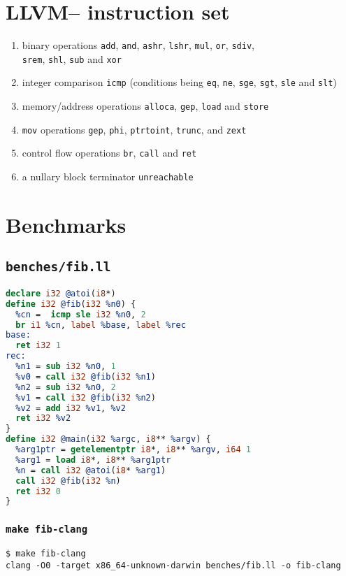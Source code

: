 \documentclass{article}
\begin{document}
\section{LLVM-- instruction set}
\label{appendix:llvmis}
\begin{enumerate}
    \item binary operations \lstinline!add!, \lstinline!and!, \lstinline!ashr!, \lstinline!lshr!, \lstinline!mul!, \lstinline!or!, \lstinline!sdiv!,\\\lstinline!srem!, \lstinline!shl!, \lstinline!sub! and \lstinline!xor!
    \item integer comparison \lstinline!icmp! (conditions being \lstinline!eq!, \lstinline!ne!, \lstinline!sge!, \lstinline!sgt!, \lstinline!sle! and \lstinline!slt!)
    \item memory/address operations \lstinline!alloca!, \lstinline!gep!, \lstinline!load! and \lstinline!store!
    \item  \lstinline!mov! operations \lstinline!gep!, \lstinline!phi!, \lstinline!ptrtoint!, \lstinline!trunc!, and \lstinline!zext!
    \item control flow operations \lstinline!br!, \lstinline!call! and \lstinline!ret!
    \item a  nullary block terminator \lstinline!unreachable!
\end{enumerate}

\section{Benchmarks}

\subsection{\lstinline!benches/fib.ll!}
\begin{lstlisting}[language=LLVM]
declare i32 @atoi(i8*)
define i32 @fib(i32 %n0) {
  %cn =  icmp sle i32 %n0, 2
  br i1 %cn, label %base, label %rec
base:
  ret i32 1
rec:
  %n1 = sub i32 %n0, 1
  %v0 = call i32 @fib(i32 %n1)
  %n2 = sub i32 %n0, 2
  %v1 = call i32 @fib(i32 %n2)
  %v2 = add i32 %v1, %v2
  ret i32 %v2
}
define i32 @main(i32 %argc, i8** %argv) {
  %arg1ptr = getelementptr i8*, i8** %argv, i64 1
  %arg1 = load i8*, i8** %arg1ptr
  %n = call i32 @atoi(i8* %arg1)
  call i32 @fib(i32 %n)
  ret i32 0
}

\end{lstlisting}

\subsubsection{\lstinline!make fib-clang!}
\begin{lstlisting}[language=none]
$ make fib-clang
clang -O0 -target x86_64-unknown-darwin benches/fib.ll -o fib-clang
\end{lstlisting}
\end{document}

